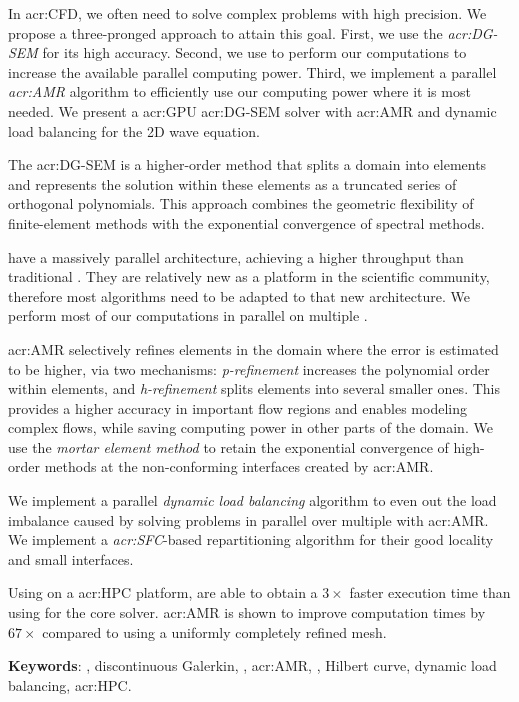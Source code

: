 \begin{adjustwidth}{-0.5in}{-0.5in}

\hspace{\parindent} %
In \acrfull{acr:CFD}, we often need to solve complex problems with high precision. We propose a
three-pronged approach to attain this goal. First, we use the \textit{\acrfull{acr:DG-SEM}} for its
high accuracy. Second, we use \textit{} to perform our computations to increase
the available parallel computing power. Third, we implement a parallel \textit{\acrfull{acr:AMR}}
algorithm to efficiently use our computing power where it is most needed. We present a
\acrshort{acr:GPU} \acrshort{acr:DG-SEM} solver with \acrshort{acr:AMR} and dynamic load balancing
for the 2D wave equation. 

The \acrshort{acr:DG-SEM} is a higher-order method that splits a domain into elements and represents
the solution within these elements as a truncated series of orthogonal polynomials. This approach
combines the geometric flexibility of finite-element methods with the exponential convergence of
spectral methods.

 have a massively parallel architecture, achieving a higher throughput than
traditional . They are relatively new as a platform in the scientific community,
therefore most algorithms need to be adapted to that new architecture. We perform most of our
computations in parallel on multiple .

\Acrshort{acr:AMR} selectively refines elements in the domain where the error is estimated to be
higher, via two mechanisms: \textit{p-refinement} increases the polynomial order within elements,
and \textit{h-refinement} splits elements into several smaller ones. This provides a higher accuracy
in important flow regions and enables modeling complex flows, while saving computing power in other
parts of the domain. We use the \textit{mortar element method} to retain the exponential convergence
of high-order methods at the non-conforming interfaces created by \acrshort{acr:AMR}.

We implement a parallel \textit{dynamic load balancing} algorithm to even out the load imbalance
caused by solving problems in parallel over multiple  with \acrshort{acr:AMR}.
We implement a \textit{\acrfull{acr:SFC}}-based repartitioning algorithm for their good locality and
small interfaces.

Using  on a \acrshort{acr:HPC} platform, are able to obtain a \(3 \times \)
faster execution time than using  for the core solver. \Acrshort{acr:AMR} is
shown to improve computation times by \(67 \times \) compared to using a uniformly completely
refined mesh.

\noindent
\textbf{Keywords}: , discontinuous Galerkin, , \acrlong{acr:AMR}, , Hilbert curve, dynamic load balancing, \acrlong{acr:HPC}.

\end{adjustwidth}
